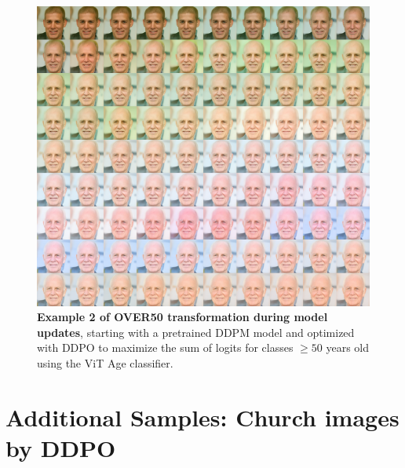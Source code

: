 \begin{appendixs}
        \begin{figure}
            \centering
            \includegraphics[scale=2.80]{img/results/over50_46.png}
            \vspace{-0pt}  %
            \captionsetup{width=\textwidth} %
            \caption{\textbf{Example 2 of OVER50 transformation during model updates}, starting with a pretrained DDPM model and optimized with DDPO to maximize the sum of logits for classes $\geq 50$ years old using the ViT Age classifier.}
            \label{fig:ddpm-to-ddpo-over50-extra2}
        \end{figure}


    \newpage

    \section{Additional Samples: Church images by DDPO}\label{appendix:additional-church-samples}



\end{appendixs}
